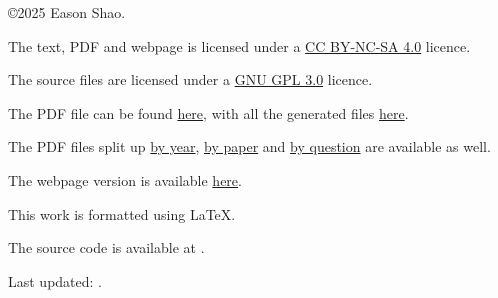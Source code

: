 \noindent \copyright 2025 Eason Shao.

\noindent The text, PDF and webpage is licensed under a \href{https://creativecommons.org/licenses/by-nc-sa/4.0/}{CC BY-NC-SA 4.0} licence.

\noindent The source files are licensed under a \href{https://www.gnu.org/licenses/gpl-3.0.en.html#license-text}{GNU GPL 3.0} licence.

\noindent The PDF file can be found \href{\BasePath latest.pdf}{here}, with all the generated files \href{\BasePath generated/pdf}{here}.

\noindent The PDF files split up \href{\BasePath generated/pdf/years}{by year}, \href{\BasePath generated/pdf/papers}{by paper} and \href{\BasePath generated/pdf/questions}{by question} are available as well.

\noindent The webpage version is available \href{\BasePath}{here}.

\noindent This work is formatted using \LaTeX.

\noindent The source code is available at .

\noindent Last updated: \Date.